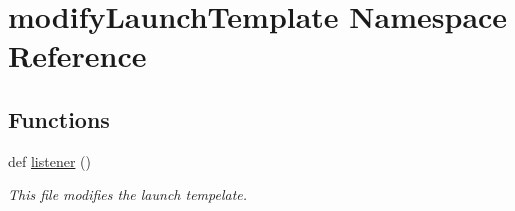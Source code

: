 \hypertarget{namespacemodifyLaunchTemplate}{}\section{modify\+Launch\+Template Namespace Reference}
\label{namespacemodifyLaunchTemplate}
\subsection*{Functions}
\begin{DoxyCompactItemize}
\item 
def \hyperlink{namespacemodifyLaunchTemplate_a7e2ff27db203e88d463bc3f4544eb0d1}{listener} ()
\begin{DoxyCompactList}\small\item\em This file modifies the launch tempelate. \end{DoxyCompactList}\end{DoxyCompactItemize}
